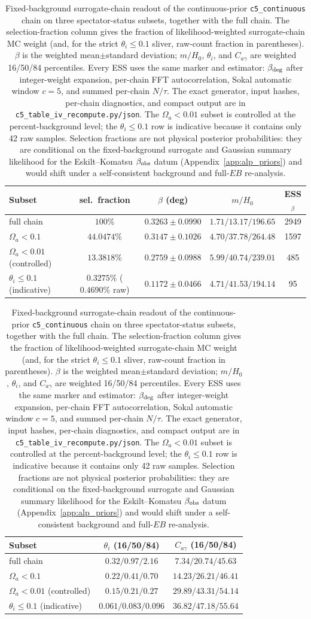 \documentclass[aps,prd,twocolumn,superscriptaddress,showpacs,preprintnumbers,nofootinbib,longbibliography,floatfix]{revtex4-2}
\begin{document}
\begin{table}[ht]
\caption{\label{tab:alp_restricted_subsets} Fixed-background surrogate-chain
readout of the continuous-prior \texttt{c5\_continuous} chain on three
spectator-status subsets, together with the full chain. The selection-fraction
column gives the fraction of likelihood-weighted surrogate-chain MC weight
(and, for the strict $\theta_i\le0.1$ sliver, raw-count fraction in
parentheses). $\beta$ is the weighted mean$\pm$standard deviation;
$m/H_0$, $\theta_i$, and $C_{a\gamma}$ are weighted 16/50/84 percentiles.
Every ESS uses the same marker and estimator: $\beta_{\rm deg}$ after
integer-weight expansion, per-chain FFT autocorrelation, Sokal automatic
window $c=5$, and summed per-chain $N/\tau$. The exact generator, input
hashes, per-chain diagnostics, and compact output are in
\texttt{c5\_table\_iv\_recompute.py/json}. The $\Omega_a<0.01$ subset is
controlled at the percent-background level; the $\theta_i\le0.1$ row is
indicative because it contains only 42 raw samples. Selection fractions are
not physical posterior probabilities: they are conditional on the
fixed-background surrogate and Gaussian summary likelihood for the
Eskilt--Komatsu $\beta_{\rm obs}$ datum (Appendix~\ref{app:alp_priors}) and
would shift under a self-consistent background and full-$EB$ re-analysis.}
\begin{ruledtabular}
\scriptsize
\begin{tabular}{lcccc}
Subset & sel.\ fraction & $\beta$ (deg) & $m/H_0$ & ESS$_\beta$ \\
\hline
full chain & $100\%$ & $0.3263\pm0.0990$ & $1.71/13.17/196.65$ & 2949 \\
$\Omega_a<0.1$ & $44.0474\%$ & $0.3147\pm0.1026$ & $4.70/37.78/264.48$ & 1597 \\
$\Omega_a<0.01$ (controlled) & $13.3818\%$ & $0.2759\pm0.0988$ & $5.99/40.74/239.01$ & 485 \\
$\theta_i\le0.1$ (indicative) & $0.3275\%$ ($0.4690\%$ raw) & $0.1172\pm0.0466$ & $4.71/41.53/194.14$ & 95 \\
\end{tabular}
\par\medskip
\begin{tabular}{lcc}
Subset & $\theta_i$ (16/50/84) & $C_{a\gamma}$ (16/50/84) \\
\hline
full chain & $0.32/0.97/2.16$ & $7.34/20.74/45.63$ \\
$\Omega_a<0.1$ & $0.22/0.41/0.70$ & $14.23/26.21/46.41$ \\
$\Omega_a<0.01$ (controlled) & $0.15/0.21/0.27$ & $29.89/43.31/54.14$ \\
$\theta_i\le0.1$ (indicative) & $0.061/0.083/0.096$ & $36.82/47.18/55.64$ \\
\end{tabular}
\end{ruledtabular}
\end{table}
\end{document}

